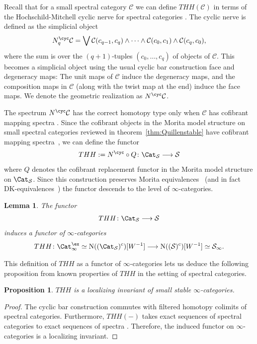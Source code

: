 \documentclass{amsart}
\let\sma\wedge
\newcommand{\htp}{\simeq}
\renewcommand{\to}{\mathchoice{\longrightarrow}{\rightarrow}{\rightarrow}{\rightarrow}}
\let\catsymbfont\mathcal
\newcommand{\aC}{{\catsymbfont{C}}}
\newcommand{\aS}{{\catsymbfont{S}}}
\newcommand{\N}{\mathrm{N}}
\newcommand{\stabcat}{\Cat_\i^{\ex}}
\newcommand{\ispec}{\aS_{\infty}}
\newcommand{\Spcat}{\Cat_\mathcal{S}}%
\newcommand{\Spt}{\mathcal{S}}%
\renewcommand{\i}{\infty}
\numberwithin{equation}{section}
\newtheorem{lemma}[equation]{Lemma}
\newtheorem{proposition}[equation]{Proposition}
\theoremstyle{definition}
\begin{document}
Recall that for a small spectral category $\aC$ we can define
$THH(\aC)$ in terms of the Hochschild-Mitchell cyclic nerve for
spectral categories \cite[\S 3]{BM}.  The cyclic nerve is defined as
the simplicial object  
\[
N^{\cyc}_{q}\aC = \bigvee \aC(c_{q-1},c_{q}) \sma \dotsb \sma
\aC(c_{0},c_{1}) \sma \aC(c_{q},c_{0}),
\]
where the sum is over the $(q+1)$-tuples $(c_{0},\dotsc,c_{q})$ of
objects of $\aC$.  This becomes a simplicial object using the usual
cyclic bar construction face and degeneracy maps: The unit
maps of $\aC$ induce the degeneracy maps, and the composition maps in
$\aC$ (along with the twist map at the end) induce the face maps.  We
denote the geometric realization as $N^{\cyc} \aC$.

The spectrum $N^{\cyc} \aC$ has the correct homotopy type only when
$\aC$ has cofibrant mapping spectra \cite[3.1]{BM}.  Since the
cofibrant objects in the Morita model structure on small spectral categories
reviewed in theorem~\ref{thm:Quillenstable} have cofibrant mapping
spectra~\cite[4.18]{Spectral}, we can define the functor
\[
THH:= N^{\cyc}\circ Q \colon \Spcat \to \Spt
\]
where $Q$ denotes the cofibrant replacement functor in the Morita 
model structure on $\Spcat$.  Since this construction preserves Morita
equivalences~\cite[5.12]{BM} (and in fact
DK-equivalences~\cite[5.9]{BM}) the functor descends to the level of
$\i$-categories.

\begin{lemma}\label{lem:thhinf}
The functor
\[
THH \colon \Spcat \to \Spt
\]
induces a functor of $\i$-categories
\[
THH \colon \stabcat \htp \N((\Spcat)^{\mathrm{c}})[W^{-1}] \to \N((\Spt)^{\mathrm{c}})[W^{-1}] \htp \ispec.
\]
\end{lemma}

This definition of $THH$ as a functor of $\i$-categories lets us
deduce the following proposition from known properties of
$THH$ in the setting of spectral categories.

\begin{proposition}
$THH$ is a localizing invariant of small stable $\i$-categories.
\end{proposition}

\begin{proof}
The cyclic bar construction commutes with filtered homotopy
colimits of spectral categories.  Furthermore, $THH(-)$ takes exact 
sequences of spectral categories to exact sequences of
spectra \cite[7.1]{BM}.  Therefore, the induced functor on
$\i$-categories is a localizing invariant. 
\end{proof}
\end{document}
